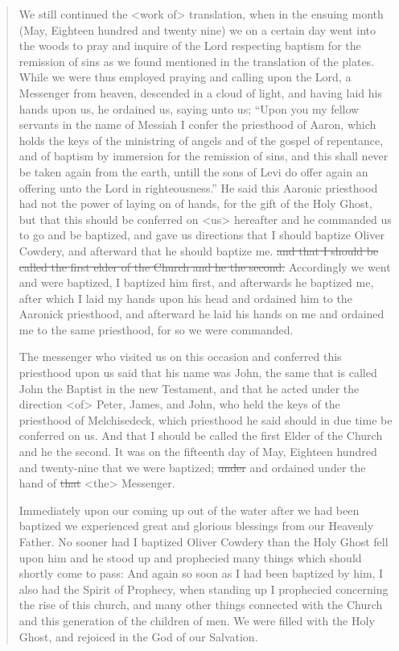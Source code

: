 			\begin{quote}
				We still continued the <work of> translation, when in the ensuing month (May, Eighteen hundred and twenty nine) we on a certain day went into the woods to pray and inquire of the Lord respecting baptism for the remission of sins as we found mentioned in the translation of the plates. While we were thus employed praying and calling upon the Lord, a Messenger from heaven, descended in a cloud of light, and having laid his hands upon us, he ordained us, saying unto us; ``Upon you my fellow servants in the name of Messiah I confer the priesthood of Aaron, which holds the keys of the ministring of angels and of the gospel of repentance, and of baptism by immersion for the remission of sins, and this shall never be taken again from the earth, untill the sons of Levi do offer again an offering unto the Lord in righteousness.'' He said this Aaronic priesthood had not the power of laying on of hands, for the gift of the Holy Ghost, but that this should be conferred on <us> hereafter and he commanded us to go and be baptized, and gave us directions that I should baptize Oliver Cowdery, and afterward that he should baptize me. \sout{and that I should be called the first elder of the Church and he the second.} Accordingly we went and were baptized, I baptized him first, and afterwards he baptized me, after which I laid my hands upon his head and ordained him to the Aaronick priesthood, and afterward he laid his hands on me and ordained me to the same priesthood, for so we were commanded.
				
				The messenger who visited us on this occasion and conferred this priesthood upon us said that his name was John, the same that is called John the Baptist in the new Testament, and that he acted under the direction <of> Peter, James, and John, who held the keys of the priesthood of Melchisedeck, which priesthood he said should in due time be conferred on us. And that I should be called the first Elder of the Church and he the second. It was on the fifteenth day of May, Eighteen hundred and twenty-nine that we were baptized; \sout{under} and ordained under the hand of \sout{that} <the> Messenger.
				
				Immediately upon our coming up out of the water after we had been baptized we experienced great and glorious blessings from our Heavenly Father. No sooner had I baptized Oliver Cowdery than the Holy Ghost fell upon him and he stood up and prophecied many things which should shortly come to pass: And again so soon as I had been baptized by him, I also had the Spirit of Prophecy, when standing up I prophecied concerning the rise of this church, and many other things connected with the Church and this generation of the children of men. We were filled with the Holy Ghost, and rejoiced in the God of our Salvation.
				

\end{quote}
